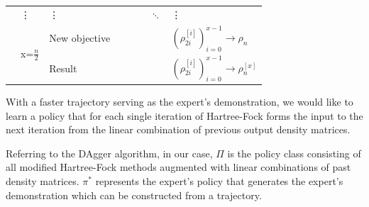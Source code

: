\documentclass[twoside]{article}
\begin{document}
\begin{center}
\begin{table}[t]
\begin{tabular}{|l|l|l|l|l|l|l|l|}
	& \vdots      & \vdots      &                &                &                & $\ddots$ &   \vdots \\ \cline{2-8} 
	& \multirow{2}{*}{ x=$\frac{n}{2}$} & New objective         &                         &                          &                            &  & $(\rho_{2i}^{[i]})_{i=0}^{x-1} \rightarrow \rho_{n}$     \\ \cline{3-8} 
	&                & Result  &                &                &                &  & $(\rho_{2i}^{[i]})_{i=0}^{x-1}\rightarrow \rho_{n}^{[x]}$ \\ \hline
	\end{tabular}
	\end{table}
\end{center} 




% 

With a faster trajectory serving as the expert's demonstration, we would like to learn a policy that for each single iteration of Hartree-Fock forms the input to the next iteration from the linear combination of previous output density matrices.   

Referring to the DAgger algorithm, in our case, $\Pi$ is the policy class consisting of all modified Hartree-Fock methods augmented with linear combinations of past density matrices. $\pi^*$ represents the expert's policy that generates the expert's demonstration which can be constructed from a trajectory. 




\end{document}
